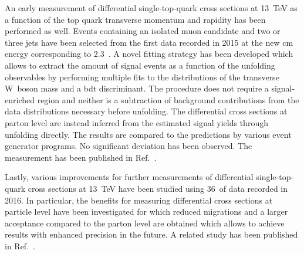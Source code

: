 An early measurement of differential single-top-quark cross sections at 13~TeV as a function of the top quark transverse momentum and rapidity has been performed as well. Events containing an isolated muon candidate and two or three jets have been selected from the first data recorded in 2015 at the new \acrlong{cm} energy corresponding to 2.3~\invfb. A novel fitting strategy has been developed which allows to extract the amount of signal events as a function of the unfolding observables by performing multiple fits to the distributions of the transverse W~boson mass and a \gls{bdt} discriminant. The procedure does not require a signal-enriched region and neither is a subtraction of background contributions from the data distributions necessary before unfolding. The differential cross sections at parton level are instead inferred from the estimated signal yields through unfolding directly. The results are compared to the predictions by various event generator programs. No significant deviation has been observed. The measurement has been published in Ref.~\cite{CMS-PAS-TOP-16-004}.

Lastly, various improvements for further measurements of differential single-top-quark cross sections at 13~TeV have been studied using 36~\invfb of data recorded in 2016. In particular, the benefits for measuring differential cross sections at particle level have been investigated for which reduced migrations and a larger acceptance compared to the parton level are obtained which allows to achieve results with enhanced precision in the future. A related study has been published in Ref.~\cite{particleStudies}.
